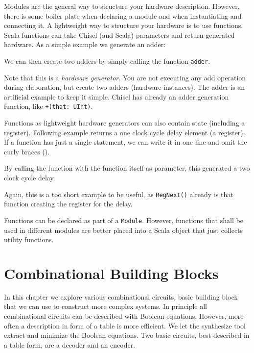 \documentclass[%
    10pt,
    headinclude, footexclude,
    openright, %
    notitlepage,
    cleardoubleempty,
    headsepline,
    pointlessnumbers,
    bibtotoc, idxtotoc,
    ]{scrbook}
\newcommand{\code}[1]{{\small{\texttt{#1}}}}
\begin{document}
Modules are the general way to structure your hardware description.
However, there is some boiler plate when declaring a module and when instantiating and
connecting it.
A lightweight way to structure your hardware is to use functions.
Scala functions can take Chisel (and Scala) parameters and return generated hardware.
As a simple example we generate an adder:


\noindent We can then create two adders by simply calling the function \code{adder}.


\noindent Note that this is a \emph{hardware generator}. You are not executing any add operation
during elaboration, but create two adders (hardware instances). The adder is an artificial example
to keep it simple. Chisel has already an adder generation function, like \code{+(that: UInt)}.

Functions as lightweight hardware generators can also contain state (including a register).
Following example returns a one clock cycle delay element (a register).
If a function has just a single statement, we can write it in one line and omit the curly
braces ({}).


\noindent By calling the function with the function itself as parameter, this generated a two
clock cycle delay.


\noindent Again, this is a too short example to be useful, as \code{RegNext()}
already is that function creating the register for the delay.

Functions can be declared as part of a \code{Module}. However, functions that shall be
used in different modules are better placed into a Scala object that just collects utility
functions.

\chapter{Combinational Building Blocks}

In this chapter we explore various combinational circuits, basic building block that we can
use to construct more complex systems.
In principle all combinational circuits can be described with Boolean equations.
However, more often a description in form of a table is more efficient.
We let the synthesize tool extract and minimize the Boolean equations.
Two basic circuits, best described in a table form, are a decoder and an encoder.
\end{document}
